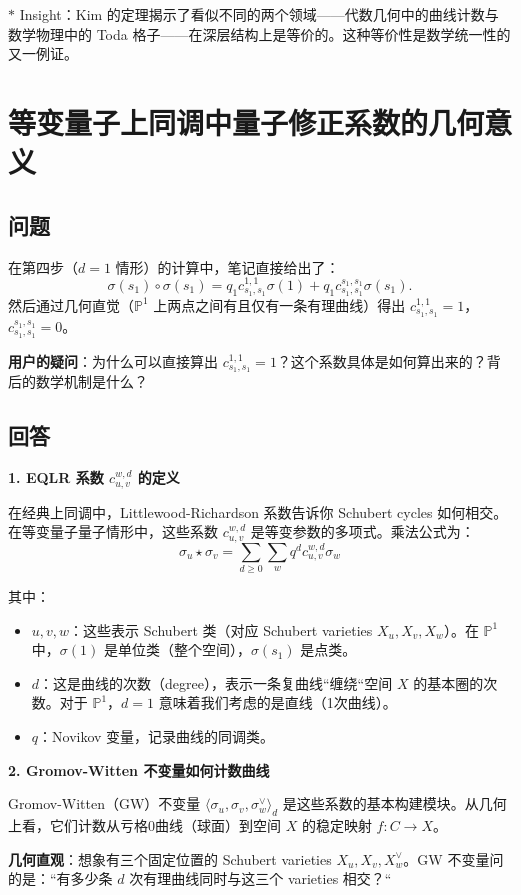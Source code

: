 $*$ Insight：Kim 的定理揭示了看似不同的两个领域——代数几何中的曲线计数与数学物理中的 Toda 格子——在深层结构上是等价的。这种等价性是数学统一性的又一例证。
 
\section{等变量子上同调中量子修正系数的几何意义}\label{sec:QuantumCorrectionCoefficients}
\subsection{问题}
在第四步（$d=1$ 情形）的计算中，笔记直接给出了：
$$\sigma(s_1) \circ \sigma(s_1) = q_1 c_{s_1,s_1}^{1,1} \sigma(1) + q_1 c_{s_1,s_1}^{s_1,s_1} \sigma(s_1).$$
然后通过几何直觉（$\mathbb{P}^1$ 上两点之间有且仅有一条有理曲线）得出 $c_{s_1,s_1}^{1,1} = 1$，$c_{s_1,s_1}^{s_1,s_1} = 0$。

\textbf{用户的疑问}：为什么可以直接算出 $c_{s_1,s_1}^{1,1} = 1$？这个系数具体是如何算出来的？背后的数学机制是什么？
\subsection{回答}
\textbf{1. EQLR 系数 $c_{u,v}^{w,d}$ 的定义}

在经典上同调中，Littlewood-Richardson 系数告诉你 Schubert cycles 如何相交。在等变量子量子情形中，这些系数 $c_{u,v}^{w,d}$ 是等变参数的多项式。乘法公式为：
$$\sigma_u \star \sigma_v = \sum_{d \geq 0} \sum_w q^d c_{u,v}^{w,d} \sigma_w$$

其中：
\begin{itemize}
\item $u, v, w$：这些表示 Schubert 类（对应 Schubert varieties $X_u, X_v, X_w$）。在 $\mathbb{P}^1$ 中，$\sigma(1)$ 是单位类（整个空间），$\sigma(s_1)$ 是点类。
\item $d$：这是曲线的次数（degree），表示一条复曲线``缠绕``空间 $X$ 的基本圈的次数。对于 $\mathbb{P}^1$，$d=1$ 意味着我们考虑的是直线（1次曲线）。
\item $q$：Novikov 变量，记录曲线的同调类。
\end{itemize}

\textbf{2. Gromov-Witten 不变量如何计数曲线}

Gromov-Witten（GW）不变量 $\langle \sigma_u, \sigma_v, \sigma_w^\vee \rangle_d$ 是这些系数的基本构建模块。从几何上看，它们计数从亏格0曲线（球面）到空间 $X$ 的稳定映射 $f : C \to X$。

\textbf{几何直观}：想象有三个固定位置的 Schubert varieties $X_u, X_v, X_w^\vee$。GW 不变量问的是：``有多少条 $d$ 次有理曲线同时与这三个 varieties 相交？``

